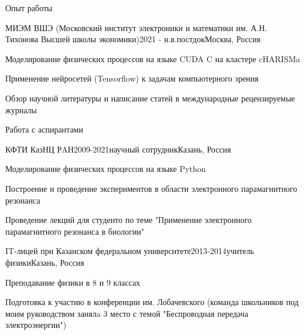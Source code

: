 \documentclass[
	a4paper, %
	11pt, %
]{resume} %
\begin{document}
\begin{rSection}{Опыт работы}

	\begin{rSubsection}{МИЭМ ВШЭ (Московский институт электроники и математики им. А.Н. Тихонова Высшей школы экономики)}{2021 - н.в.}{постдок}{Москва, Россия}
		\item Моделирование физических процессов на языке CUDA C на кластере cHARISMa
		\item Применение нейросетей (Tensorflow) к задачам компьютерного зрения
		\item Обзор научной литературы и написание статей в международные рецензируемые журналы
		\item Работа с аспирантами
	\end{rSubsection}


	\begin{rSubsection}{КФТИ КазНЦ РAН}{2009-2021}{научный сотрудник}{Казань, Россия}
		\item Моделирование физических процессов на языке Python
		\item Построение и проведение экспериментов в области электронного парамагнитного резонанса
		\item Проведение лекций для студенто по теме "Применение электронного парамагнитного резонанса в биологии"
	\end{rSubsection}


	\begin{rSubsection}{IT-лицей при Казанском федеральном университете}{2013-2014}{учитель физики}{Казань, Россия}
		\item Преподавание физики в 8 и 9 классах
		\item Подготовка к участию в конференции им. Лобачевского (команда школьников под моим руководством занялa 3 место с темой "Беспроводная передача электроэнергии")
	\end{rSubsection}


\end{rSection}

\end{document}
